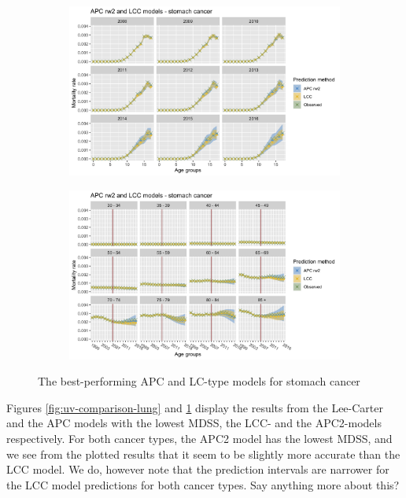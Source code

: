 \begin{figure}[h!]
    \centering
    \begin{subfigure}[b]{.45\linewidth}
        \includegraphics[width=\linewidth]{real-data/real-data-univariate/Figures/univariate-comparison-by-age-stomach.png}
    \end{subfigure}
    \begin{subfigure}[b]{.45\linewidth}
        \includegraphics[width=\linewidth]{real-data/real-data-univariate/Figures/univariate-comparison-by-period-stomach.png}
    \end{subfigure}
    \caption{The best-performing APC and LC-type models for stomach cancer}
    \label{fig:uv-comparison-stomach}
\end{figure}

Figures \ref{fig:uv-comparison-lung} and \ref{fig:uv-comparison-stomach} display the results from the Lee-Carter and the APC models with the lowest MDSS, the LCC- and the APC2-models respectively. For both cancer types, the APC2 model has the lowest MDSS, and we see from the plotted results that it seem to be slightly more accurate than the LCC model. We do, however note that the prediction intervals are narrower for the LCC model predictions for both cancer types. \textcolor{myDarkGreen}{Say anything more about this? }

